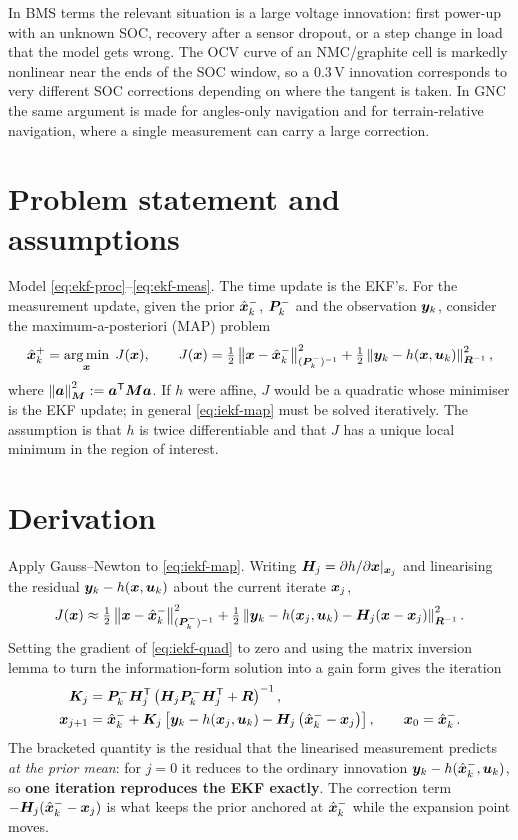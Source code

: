 In BMS terms the relevant situation is a large voltage innovation: first power-up with an
unknown SOC, recovery after a sensor dropout, or a step change in load that the model gets
wrong. The OCV curve of an NMC/graphite cell is markedly nonlinear near the ends of the SOC
window, so a $0.3$\,V innovation corresponds to very different SOC corrections depending on
where the tangent is taken. In GNC the same argument is made for angles-only navigation and
for terrain-relative navigation, where a single measurement can carry a large correction.

\section{Problem statement and assumptions}
Model \eqref{eq:ekf-proc}--\eqref{eq:ekf-meas}. The time update is the EKF's. For the
measurement update, given the prior $\hat{\bm{x}}^{-}_k$, $\bm{P}^{-}_k$ and the observation $\bm{y}_k$,
consider the maximum-a-posteriori (MAP) problem
\begin{equation}
\hat{\bm{x}}^{+}_k = \operatorname*{arg\,min}_{\bm{x}}\; J(\bm{x}), \qquad
J(\bm{x}) = \tfrac12\left\lVert \bm{x} - \hat{\bm{x}}^{-}_k \right\rVert^2_{(\bm{P}^{-}_k)^{-1}} + \tfrac12\left\lVert \bm{y}_k - h(\bm{x},\bm{u}_k) \right\rVert^2_{\bm{R}^{-1}},
\label{eq:iekf-map}
\end{equation}
where $\left\lVert \bm{a} \right\rVert^2_{\bm{M}} := \bm{a}^{\mathsf{T}}\bm{M}\bm{a}$. If $h$ were affine, $J$ would be a
quadratic whose minimiser is the EKF update; in general \eqref{eq:iekf-map} must be solved
iteratively. The assumption is that $h$ is twice differentiable and that $J$ has a unique
local minimum in the region of interest.

\section{Derivation}
Apply Gauss--Newton to \eqref{eq:iekf-map}. Writing $\bm{H}_j = \partial h/\partial\bm{x}|_{\bm{x}_j}$
and linearising the residual $\bm{y}_k - h(\bm{x},\bm{u}_k)$ about the current iterate $\bm{x}_j$,
\begin{equation}
J(\bm{x}) \approx \tfrac12\left\lVert \bm{x}-\hat{\bm{x}}^{-}_k \right\rVert^2_{(\bm{P}^{-}_k)^{-1}}
 + \tfrac12\left\lVert \bm{y}_k - h(\bm{x}_j,\bm{u}_k) - \bm{H}_j(\bm{x}-\bm{x}_j) \right\rVert^2_{\bm{R}^{-1}}.
\label{eq:iekf-quad}
\end{equation}
Setting the gradient of \eqref{eq:iekf-quad} to zero and using the matrix inversion lemma to
turn the information-form solution into a gain form gives the iteration
\begin{align}
\bm{K}_j &= \bm{P}^{-}_k\bm{H}_j^{\mathsf{T}}\left(\bm{H}_j\bm{P}^{-}_k\bm{H}_j^{\mathsf{T}} + \bm{R}\right)^{-1}, \label{eq:iekf-K}\\
\bm{x}_{j+1} &= \hat{\bm{x}}^{-}_k + \bm{K}_j\left[\bm{y}_k - h(\bm{x}_j,\bm{u}_k) - \bm{H}_j\left(\hat{\bm{x}}^{-}_k - \bm{x}_j\right)\right],
\qquad \bm{x}_0 = \hat{\bm{x}}^{-}_k. \label{eq:iekf-iter}
\end{align}
The bracketed quantity is the residual that the linearised measurement predicts \emph{at the
prior mean}: for $j=0$ it reduces to the ordinary innovation $\bm{y}_k - h(\hat{\bm{x}}^{-}_k,\bm{u}_k)$, so
\textbf{one iteration reproduces the EKF exactly}. The correction term
$-\bm{H}_j(\hat{\bm{x}}^{-}_k - \bm{x}_j)$ is what keeps the prior anchored at $\hat{\bm{x}}^{-}_k$ while the
expansion point moves.

